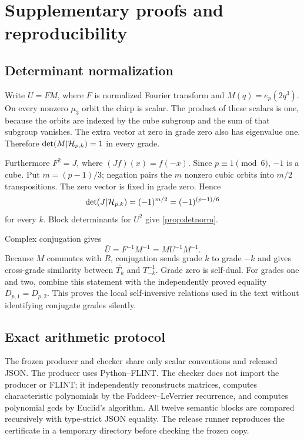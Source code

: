 \section{Supplementary proofs and reproducibility}

\subsection{Determinant normalization}\label{app:detnorm}

Write $U=FM$, where $F$ is normalized Fourier transform and
$M(q)=e_p(2q^3)$.  On every nonzero $\mu_3$ orbit the chirp is scalar.  The
product of these scalars is one, because the orbits are indexed by the cube
subgroup and the sum of that subgroup vanishes.  The extra vector at zero in
grade zero also has eigenvalue one.  Therefore
$\det(M|\mathcal H_{p,k})=1$ in every grade.

Furthermore $F^2=J$, where $(Jf)(x)=f(-x)$.  Since
$p\equiv1\pmod6$, $-1$ is a cube.  Put $m=(p-1)/3$; negation pairs the $m$
nonzero cubic orbits into $m/2$ transpositions.  The zero vector is fixed in
grade zero.  Hence
\[
\det(J|\mathcal H_{p,k})=(-1)^{m/2}=(-1)^{(p-1)/6}
\]
for every $k$.  Block determinants for $U^2$ give
\cref{prop:detnorm}.

Complex conjugation gives
\[
\bar U=F^{-1}M^{-1}=MU^{-1}M^{-1}.
\]
Because $M$ commutes with $R$, conjugation sends grade $k$ to grade $-k$ and
gives cross-grade similarity between $\overline{T_k}$ and $T_{-k}^{-1}$.
Grade zero is self-dual.  For grades one and two, combine this statement with
the independently proved equality $D_{p,1}=D_{p,2}$.  This proves the local
self-inversive relations used in the text without identifying conjugate
grades silently.

\subsection{Exact arithmetic protocol}

The frozen producer and checker share only scalar conventions and released
JSON.  The producer uses Python--FLINT.  The checker does not import the
producer or FLINT; it independently reconstructs matrices, computes
characteristic polynomials by the Faddeev--LeVerrier recurrence, and computes
polynomial gcds by Euclid's algorithm.  All twelve semantic blocks are compared
recursively with type-strict JSON equality.  The release runner reproduces
the certificate in a temporary directory before checking the frozen copy.
